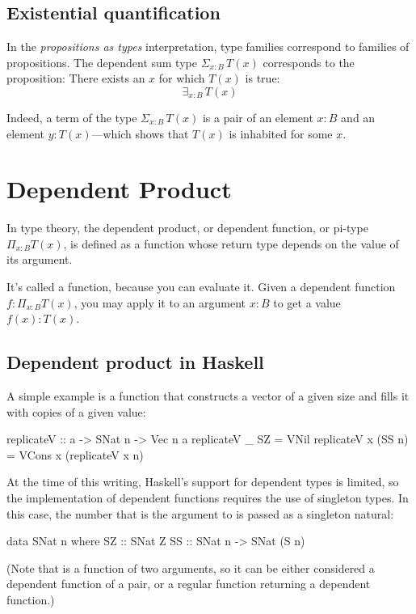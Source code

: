 \documentclass[DaoFP]{subfiles}
\begin{document}
\subsection{Existential quantification}

In the \emph{propositions as types} interpretation, type families correspond to families of propositions. The dependent sum type $\Sigma_{x : B} \, T(x)$ corresponds to the proposition: There exists an $x$ for which $T(x)$ is true:
\[ \exists_{x : B} \, T (x)\]

Indeed, a term of the type $\Sigma_{x : B} \, T(x)$ is a pair of an element $x \colon B$ and an element $y \colon T(x)$---which shows that $T(x)$ is inhabited for some $x$.

\section{Dependent Product}

In type theory, the dependent product, or dependent function, or pi-type $\Pi_{x:B} T(x)$, is defined as a function whose return type depends on the value of its argument. 

It's called a function, because you can evaluate it. Given a dependent function  $f \colon \Pi_{x:B} T(x)$, you may apply it to an argument $x\colon B$ to get a value $f(x) \colon T(x)$.

\subsection{Dependent product in Haskell}
A simple example is a function that constructs a vector of a given size and fills it with copies of a given value:
\begin{haskell}
replicateV :: a -> SNat n -> Vec n a
replicateV _ SZ  = VNil
replicateV x (SS n) = VCons x (replicateV x n)
\end{haskell}

At the time of this writing, Haskell's support for dependent types is limited, so the implementation of dependent functions requires the use of singleton types. In this case, the number that is the argument to  is passed as a singleton natural:
\begin{haskell}
data SNat n where
  SZ :: SNat Z
  SS :: SNat n -> SNat (S n)
\end{haskell}
(Note that  is a function of two arguments, so it can be either considered a dependent function of a pair, or a regular function returning a dependent function.)
\end{document}
